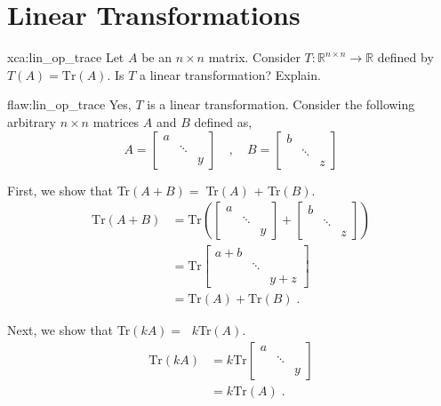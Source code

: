 \section{Linear Transformations}

\begin{xca}{xca:lin_op_trace}
Let $A$ be an $n \times n$ matrix. Consider $T: \mathbb{R}^{n\times n} \rightarrow \mathbb{R}$ defined by $T(A) = \text{Tr}(A).$ Is $T$ a linear transformation? Explain.
\end{xca}

\begin{flaw}{flaw:lin_op_trace} %
Yes, $T$ is a linear transformation. Consider the following arbitrary $n \times n$ matrices $A$ and $B$ defined as,
$$
  A =
  \begin{bmatrix}
    a & & \\
    & \ddots & \\
    & & y
  \end{bmatrix} \quad , \quad B =
  \begin{bmatrix}
    b & & \\
    & \ddots & \\
    & & z
  \end{bmatrix}
$$

First, we show that Tr$(A+B)=\;$Tr$(A)$ + Tr$(B)$.
\begin{align*}
\text{Tr}(A+B) &= \text{Tr}\left(  \begin{bmatrix}
    a & & \\
    & \ddots & \\
    & & y
  \end{bmatrix} +
  \begin{bmatrix}
    b & & \\
    & \ddots & \\
    & & z
  \end{bmatrix} \right) \\
   &= \text{Tr} \begin{bmatrix}
    a+b & & \\
    & \ddots & \\
    & & y+z
  \end{bmatrix} \\
  &= \text{Tr}(A) + \text{Tr}(B)\;.
  \end{align*}

Next,  we show that Tr$(kA)=\;$ $k$Tr$(A)$.
\begin{align*}
\text{Tr}(kA) &= k\text{Tr}\begin{bmatrix}
    a & & \\
    & \ddots & \\
    & & y
  \end{bmatrix} \\
  &= k\text{Tr}(A)\;.
  \end{align*}
\end{flaw}

